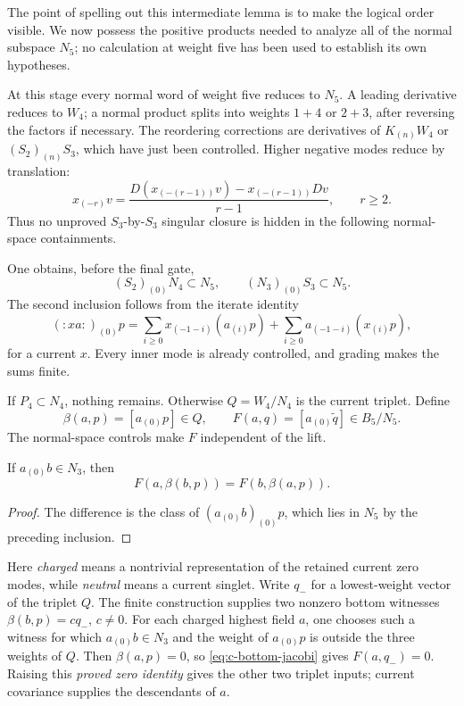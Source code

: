 The point of spelling out this intermediate lemma is to make the
logical order visible. We now possess the positive products needed
to analyze all of the normal subspace $N_5$; no calculation at
weight five has been used to establish its own hypotheses.

At this stage every normal word of weight five reduces to $N_5$.
A leading derivative reduces to $W_4$; a normal product splits into
weights $1+4$ or $2+3$, after reversing the factors if necessary.
The reordering corrections are derivatives of $K_{(n)}W_4$ or
$(S_2)_{(n)}S_3$, which have just been controlled. Higher negative
modes reduce by translation:
\[
 x_{(-r)}v=\frac{D(x_{(-(r-1))}v)-x_{(-(r-1))}Dv}{r-1},
 \qquad r\geq2.
\]
Thus no unproved $S_3$-by-$S_3$ singular closure is hidden in the
following normal-space containments.

One obtains, before the final gate,
\[
 (S_2)_{(0)}N_4\subset N_5,
 \qquad (N_3)_{(0)}S_3\subset N_5.
\]
The second inclusion follows from the iterate identity
\[
 (:xa:)_{(0)}p=
 \sum_{i\geq0}x_{(-1-i)}(a_{(i)}p)
 +\sum_{i\geq0}a_{(-1-i)}(x_{(i)}p),
\]
for a current $x$. Every inner mode is already controlled, and grading
makes the sums finite.

If $P_4\subset N_4$, nothing remains. Otherwise $Q=W_4/N_4$ is the
current triplet. Define
\[
 \beta(a,p)=[a_{(0)}p]\in Q,
 \qquad F(a,q)=[a_{(0)}\widetilde q]\in B_5/N_5.
\]
The normal-space controls make $F$ independent of the lift.

\begin{lemma}
If $a_{(0)}b\in N_3$, then
\begin{equation}\label{eq:c-bottom-jacobi}
 F(a,\beta(b,p))=F(b,\beta(a,p)).
\end{equation}
\end{lemma}
\begin{proof}
The difference is the class of $(a_{(0)}b)_{(0)}p$, which lies
in $N_5$ by the preceding inclusion.
\end{proof}

Here \emph{charged} means a nontrivial representation of the retained
current zero modes, while \emph{neutral} means a current singlet.
Write $q_-$ for a lowest-weight vector of the triplet $Q$.
The finite construction supplies two nonzero bottom witnesses
$\beta(b,p)=cq_-$, $c\ne0$. For each charged highest field $a$,
one chooses such a witness for which $a_{(0)}b\in N_3$ and the
weight of $a_{(0)}p$ is outside the three weights of $Q$. Then
$\beta(a,p)=0$, so \eqref{eq:c-bottom-jacobi} gives
$F(a,q_-)=0$. Raising this \emph{proved zero identity} gives the
other two triplet inputs; current covariance supplies the descendants
of $a$.


